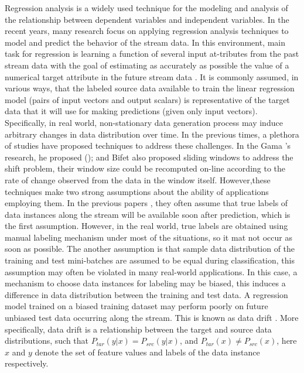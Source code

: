 Regression analysis is a widely  used  technique  for  the 
modeling and analysis of the relationship   between dependent 
variables and independent variables\cite{Friedman}.  In  the  
recent years, many research focus on applying regression 
analysis techniques to model and predict the behavior of the 
stream data. In this environment, main task for regression is 
learning a function of several input at-tributes from the past 
stream data with the goal of estimating as accurately as 
possible the value of a numerical target attribute in the future 
stream data \cite{Gama} \cite{Lughofer}. It is commonly assumed, 
in various ways, that the labeled source data available to train 
the linear regression model (pairs of input vectors and output 
scalars) is representative of the target data that it will use 
for making predictions (given only input vectors). Specifically, 
in real world, non-stationary  data generation process may 
induce arbitrary changes in data distribution over time.  In the 
previous times, a plethora  of  studies  have  proposed 
techniques to address these challenges. In the  
Gama\cite{Gama_drift} 's research, he proposed (); and 
Bifet\cite{Bifet} also proposed sliding windows to address the 
shift problem, their window size could be recomputed on-line 
according to the rate of change observed from the data in the 
window itself. However,these techniques  make  two  strong  
assumptions  about  the ability of applications employing them. 
In the previous papers , they often assume that true labels of 
data instances along the stream will be available soon after 
prediction, which is the first assumption. However, in the real 
world, true labels are  obtained using manual labeling mechanism 
under most of the situations, so it mat not occur as soon as 
possible. The another assumption is that  sample  data  
distribution of the training and test mini-batches are assumed 
to be equal during classification, this assumption may often be 
violated in many real-world applications. In this case, a 
mechanism to choose data instances  for  labeling  may  be  biased, this  induces  a  difference  in  data  distribution  between  the  training  and test data.  A regression model trained on a biased training dataset may perform poorly on future unbiased test data occurring along the stream. This is known as data drift \cite{Gama_drift}.
More specifically, data drift is a relationship between the target and source data distributions, such that $P_{tar}(y \vert {x}) = P_{src}(y \vert {x})$, and $P_{tar}(x) \ne P_{src}(x)$, here $x$ and $y$ denote the set of feature values and labels of the data instance respectively.



